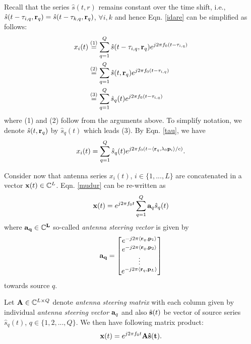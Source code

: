 \documentclass[article]{imsart}
\begin{document}
Recall that the series $\hat{s}(t,r)$ remains constant over the time shift, i.e., $\hat{s}(t-\tau_{i,q},{\bf r}_q) = \hat{s}(t-\tau_{k,q},{\bf r}_q)$, $\forall i,k$ and hence Eqn. \ref{idare} can be simplified as follows:
\begin{equation}
\begin{split}
x_i(t) &\stackrel{(1)}{=} \sum_{q=1}^Q \hat{s}(t-\tau_{i,q},{\bf r}_q)e^{j2\pi f_0 (t-\tau_{i,q})}\\
&\stackrel{(2)}{=} \sum_{q=1}^Q \hat{s}(t, {\bf r}_q)e^{j2\pi f_0 (t-\tau_{i,q})}\\
&\stackrel{(3)}{=} \sum_{q=1}^Q \hat{s}_q(t)e^{j2\pi f_0 (t-\tau_{i,q})}
\end{split}
\end{equation}
where (1) and (2) follow from the arguments above. To simplify notation, we denote $\hat{s}(t,{\bf r}_q)$ by $\hat{s}_q(t)$ which leads (3).
By Eqn. \ref{tau}, we have
\begin{equation}\label{mudur}
x_i(t) = \sum_{q=1}^Q \hat{s}_q(t)e^{j2\pi f_0 (t- \langle {\bf r}_q,\lambda_0{\bf p}_i\rangle/c)}.
\end{equation}
 
Consider now that antenna series $x_i(t)$, $i\in \{ 1,...,L\}$ are concatenated in a vector ${\bf x}(t) \in \mathbb{C}^L$. Eqn. \ref{mudur} can be re-written as
 \begin{equation}
{\bf x}(t) = e^{j2\pi f_0 t} \sum_{q=1}^Q {\bf a}_q \hat{s}_q(t)\label{ind_xt}
\end{equation}
where $\bf{a}_q \in \mathbb{C}^L$ so-called {\it antenna steering vector} is given by
\begin{equation}\label{steering}
\bf{a}_q =
  \begin{bmatrix}
    e^{-j2\pi \langle {\bf r}_q, {\bf p}_1 \rangle}   \\
    e^{-j2\pi \langle {\bf r}_q, {\bf p}_2 \rangle}    \\
    \vdots \\
    e^{-j2\pi \langle {\bf r}_q, {\bf p}_L \rangle}   
  \end{bmatrix}
 \end{equation}
 towards source $q$.
 
Let ${\bf A} \in \mathbb{C}^{L\times Q}$ denote {\it antenna steering matrix} with each column given by individual {\it antenna steering vector} ${\bf a}_q$ and also $\hat{\bf{s}}(t)$ be vector of source series $\hat{s}_q(t)$, $q \in \{ 1,2,...,Q \}$. We then have following matrix product:
 \begin{equation}
 {\bf x}(t) = e^{j2\pi f_0 t}\bf{A} \hat{\bf{s}}(t).
 \end{equation}
 
\end{document}

